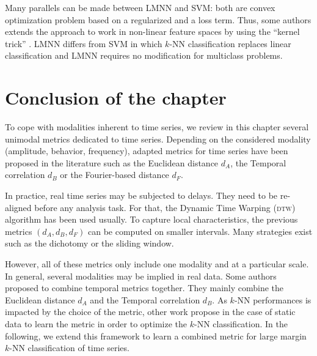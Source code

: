 Many parallels can be made between LMNN and SVM: both are convex optimization problem based on a regularized and a loss term. Thus, some authors extends the approach to work in non-linear feature spaces by using the “kernel trick” . LMNN differs from SVM in which $k$-NN classification replaces linear classification and LMNN requires no modification for multiclass problems.





\section{Conclusion of the chapter}
To cope with modalities inherent to time series, we review in this chapter several unimodal metrics dedicated to time series. Depending on the considered modality (amplitude, behavior, frequency), adapted metrics for time series have been proposed in the literature such as the Euclidean distance $d_A$, the Temporal correlation $d_B$ or the Fourier-based distance $d_F$.

In practice, real time series may be subjected to delays. They need to be re-aligned before any analysis task. For that, the Dynamic Time Warping (\textsc{dtw}) algorithm has been used usually. To capture local characteristics, the previous metrics $(d_A, d_B, d_F)$ can be computed on smaller intervals. Many strategies exist such as the dichotomy or the sliding window.

However, all of these metrics only include one modality and at a particular scale. In general, several modalities may be implied in real data. Some authors proposed to combine temporal metrics together. They mainly combine the Euclidean distance $d_A$ and the Temporal correlation $d_B$. As $k$-NN performances is impacted by the choice of the metric, other work propose in the case of static data to learn the metric in order to optimize the $k$-NN classification. In the following, we extend this framework to learn a combined metric for large margin $k$-NN classification of time series.







